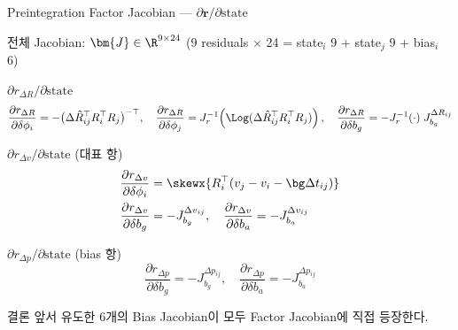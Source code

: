 \begin{frame}[shrink=10]{Preintegration Factor Jacobian — $\partial \bm{r} / \partial \text{state}$}

  전체 Jacobian: $\bm{J} \in \R^{9\times 24}$
  (9 residuals $\times$ 24 = state$_i$ 9 + state$_j$ 9 + bias$_i$ 6)

  \pause
  \begin{block}{$\partial r_{\Delta R} / \partial \text{state}$}
    \[
      \frac{\partial r_{\Delta R}}{\partial \delta\phi_i}
        = -\bigl(\Delta\hat{R}_{ij}^\top R_i^\top R_j\bigr)^{-\top},\quad
      \frac{\partial r_{\Delta R}}{\partial \delta\phi_j}
        = J_r^{-1}\!\left(\Log(\Delta\hat{R}_{ij}^\top R_i^\top R_j)\right),\quad
      \frac{\partial r_{\Delta R}}{\partial \delta b_g}
        = -J_r^{-1}(\cdot)\;J_{b_g}^{\Delta R_{ij}}
    \]
  \end{block}

  \pause
  \begin{block}{$\partial r_{\Delta v} / \partial \text{state}$ (대표 항)}
    \begin{align*}
      \frac{\partial r_{\Delta v}}{\partial \delta\phi_i}
        &= \skewx{R_i^\top(v_j - v_i - \bg\Delta t_{ij})}\\
      \frac{\partial r_{\Delta v}}{\partial \delta b_g}
        &= -J_{b_g}^{\Delta v_{ij}},\quad
      \frac{\partial r_{\Delta v}}{\partial \delta b_a}
        = -J_{b_a}^{\Delta v_{ij}}
    \end{align*}
  \end{block}

  \pause
  \begin{block}{$\partial r_{\Delta p} / \partial \text{state}$ (bias 항)}
    \[
      \frac{\partial r_{\Delta p}}{\partial \delta b_g}
        = -J_{b_g}^{\Delta p_{ij}},\quad
      \frac{\partial r_{\Delta p}}{\partial \delta b_a}
        = -J_{b_a}^{\Delta p_{ij}}
    \]
  \end{block}

  \pause
  \begin{exampleblock}{결론}
    앞서 유도한 6개의 Bias Jacobian이 모두 Factor Jacobian에 직접 등장한다.
  \end{exampleblock}
\end{frame}


